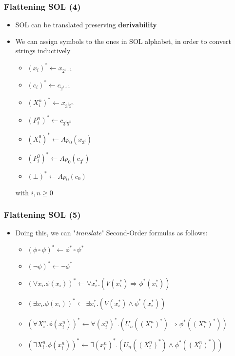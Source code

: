 \documentclass{beamer}
\begin{document}
                \begin{frame}
                    \frametitle{Flattening SOL (4)}
                    \begin{itemize}
                        \item SOL can be translated preserving \textbf{derivability}
                        \item We can assign symbols to the ones in SOL alphabet, in order to convert strings inductively
                        \begin{itemize}
                            \item $ (x_i)^* \leftarrow x_{2^{i + 1}} $
                            \item $ (c_i)^* \leftarrow c_{2^{i + 1}} $
                            \item $ (X^n_i)^* \leftarrow x_{3^i5^n} $
                            \item $ (P^n_i)^* \leftarrow c_{3^i5^n} $
                            \item $ (X^0_i)^* \leftarrow Ap_0(x_{3^i}) $
                            \item $ (P^0_i)^* \leftarrow Ap_0(c_{3^i}) $
                            \item $ (\bot)^* \leftarrow Ap_0(c_0) $
                        \end{itemize}
                        with $ i,n \geq 0 $
                    \end{itemize}
                \end{frame}

                \begin{frame}
                    \frametitle{Flattening SOL (5)}
                    \begin{itemize}
                        \item Doing this, we can "\textit{translate}" Second-Order formulas as follows:
                              \begin{itemize}
                                \item $ (\phi\, \square\, \psi)^* \leftarrow \phi^*\, \square\, \psi^* $
                                \item $ (\neg \phi)^* \leftarrow \neg \phi^* $
                                \item $ (\forall x_i. \phi(x_i))^* \leftarrow \forall x_i^*. (V(x_i^*) \Rightarrow \phi^*(x_i^*)) $
                                \item $ (\exists x_i. \phi(x_i))^* \leftarrow \exists x_i^*. (V(x_i^*) \wedge \phi^*(x_i^*)) $
                                \item $ (\forall X^n_i. \phi(x^n_i))^* \leftarrow \forall (x^n_i)^*. (U_n((X^n_i)^*) \Rightarrow \phi^*((X^n_i)^*)) $
                                \item $ (\exists X^n_i. \phi(x^n_i))^* \leftarrow \exists (x^n_i)^*. (U_n((X^n_i)^*) \wedge \phi^*((X^n_i)^*)) $
                              \end{itemize}
                    \end{itemize}
                \end{frame}
\end{document}
